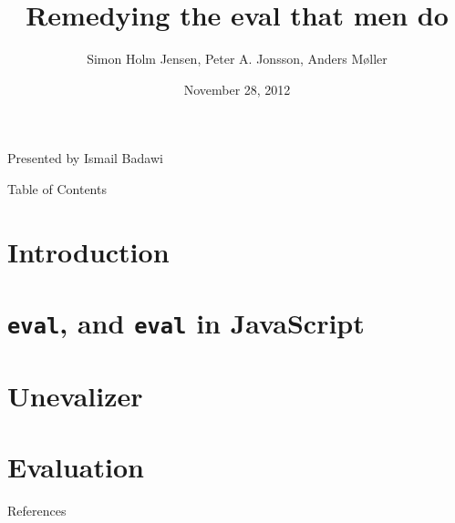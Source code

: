 \documentclass{beamer}
\title[Remedying the eval that men do]
{Remedying the eval that men do}
\date{November 28, 2012}
\author[Jensen et al.]{Simon Holm Jensen, Peter A. Jonsson, Anders M{\o}ller}
\begin{document}

\begin{frame}
\nocite{Remedying}
\nocite{Eval}
\titlepage
\begin{center}
Presented by Ismail Badawi
\end{center}
\end{frame}

\begin{frame}{Table of Contents}
\tableofcontents
\end{frame}

\section{Introduction}
\section{{\tt eval}, and {\tt eval} in JavaScript}
\section{Unevalizer}
\section{Evaluation}

\begin{frame}{References}

{\footnotesize
}
\end{frame}
\end{document}
